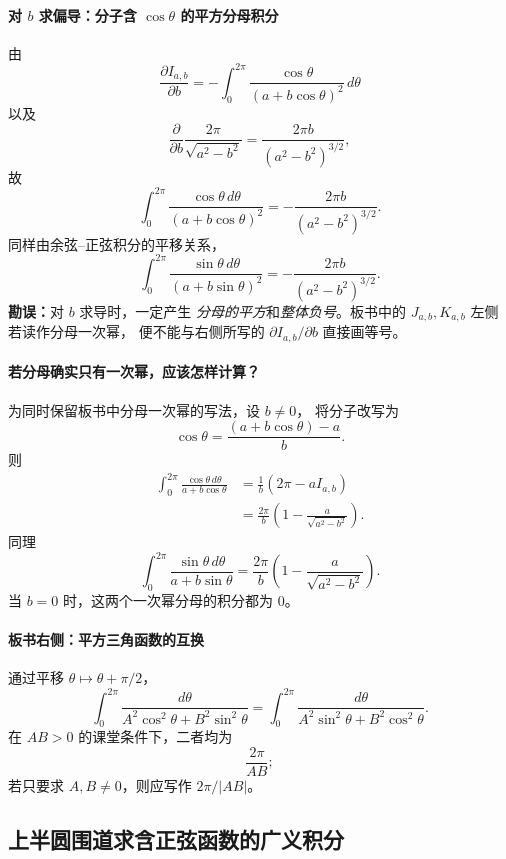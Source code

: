 \paragraph{对 $b$ 求偏导：分子含 $\cos\theta$ 的平方分母积分}
由
\[
  \frac{\partial I_{a,b}}{\partial b}
   =-\int_0^{2\pi}
     \frac{\cos\theta}{(a+b\cos\theta)^2}\,d\theta
\]
以及
\[
  \frac{\partial}{\partial b}
     \frac{2\pi}{\sqrt{a^2-b^2}}
   =\frac{2\pi b}{(a^2-b^2)^{3/2}},
\]
故
\[
  \boxed{
  \int_0^{2\pi}
     \frac{\cos\theta\,d\theta}
          {(a+b\cos\theta)^2}
  =-\frac{2\pi b}{(a^2-b^2)^{3/2}}.
  }
\]
同样由余弦--正弦积分的平移关系，
\[
  \boxed{
  \int_0^{2\pi}
     \frac{\sin\theta\,d\theta}
          {(a+b\sin\theta)^2}
  =-\frac{2\pi b}{(a^2-b^2)^{3/2}}.
  }
\]
\textbf{勘误：}对 $b$ 求导时，一定产生
\emph{分母的平方}和\emph{整体负号}。板书中的
$J_{a,b},K_{a,b}$ 左侧若读作分母一次幂，
便不能与右侧所写的 $\partial I_{a,b}/\partial b$ 直接画等号。

\paragraph{若分母确实只有一次幂，应该怎样计算？}
为同时保留板书中分母一次幂的写法，设 $b\ne0$，
将分子改写为
\[
  \cos\theta
  =\frac{(a+b\cos\theta)-a}{b}.
\]
则
\begin{align*}
  \int_0^{2\pi}
     \frac{\cos\theta\,d\theta}{a+b\cos\theta}
  &=\frac1b
      \left(2\pi-a I_{a,b}\right)\\
  &=\boxed{
      \frac{2\pi}{b}
      \left(1-\frac{a}{\sqrt{a^2-b^2}}\right).
     }
\end{align*}
同理
\[
  \int_0^{2\pi}
     \frac{\sin\theta\,d\theta}{a+b\sin\theta}
  =\frac{2\pi}{b}
      \left(1-\frac{a}{\sqrt{a^2-b^2}}\right).
\]
当 $b=0$ 时，这两个一次幂分母的积分都为 $0$。

\paragraph{板书右侧：平方三角函数的互换}
通过平移 $\theta\mapsto\theta+\pi/2$，
\[
  \int_0^{2\pi}
    \frac{d\theta}{A^2\cos^2\theta+B^2\sin^2\theta}
  =\int_0^{2\pi}
    \frac{d\theta}{A^2\sin^2\theta+B^2\cos^2\theta}.
\]
在 $AB>0$ 的课堂条件下，二者均为
\[
  \boxed{\frac{2\pi}{AB}};
\]
若只要求 $A,B\ne0$，则应写作 $2\pi/|AB|$。


\subsection*{上半圆围道求含正弦函数的广义积分}
